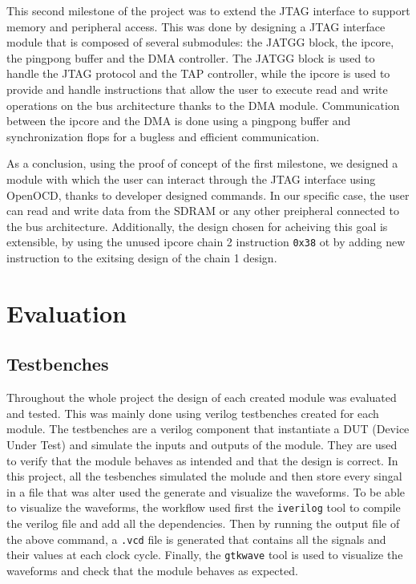 \documentclass[a4paper,11pt,oneside]{report}
\begin{document}
This second milestone of the project was to extend the JTAG interface to support memory and peripheral access.
This was done by designing a JTAG interface module that is composed of several submodules: the JATGG block, the ipcore, the pingpong buffer and the DMA controller.
The JATGG block is used to handle the JTAG protocol and the TAP controller, while the ipcore is used to provide and handle instructions
that allow the user to execute read and write operations on the bus architecture thanks to the DMA module. 
Communication between the ipcore and the DMA is done using a pingpong buffer and synchronization flops for a bugless and efficient communication.

As a conclusion, using the proof of concept of the first milestone, 
we designed a module with which the user can interact through the JTAG interface using OpenOCD, thanks to developer designed commands.
In our specific case, the user can read and write data from the SDRAM or any other preipheral connected to the bus architecture. 
Additionally, the design chosen for acheiving this goal is extensible, by using the unused ipcore chain 2 instruction \texttt{0x38} ot by adding new instruction to the 
exitsing design of the chain 1 design.


\chapter{Evaluation}

\section{Testbenches}

Throughout the whole project the design of each created module was evaluated and tested. This was mainly done using verilog testbenches created for each module.
The testbenches are a verilog component that instantiate a DUT (Device Under Test) and simulate the inputs and outputs of the module.
They are used to verify that the module behaves as intended and that the design is correct. 
In this project, all the tesbenches simulated the molude and then store every singal in a file that was alter used the generate and visualize the waveforms.
To be able to visualize the waveforms, the workflow used first the \texttt{iverilog} tool to compile the verilog file and add all the dependencies.
Then by running the output file of the above command, a \texttt{.vcd} file is generated that contains all the signals and their values at each clock cycle.
Finally, the \texttt{gtkwave} tool is used to visualize the waveforms and check that the module behaves as expected.
\end{document}
